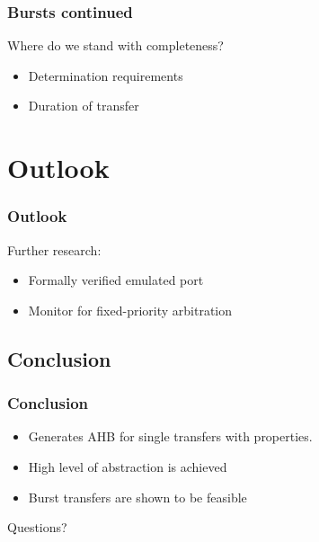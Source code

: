 \documentclass[]{beamer}
\begin{document}
\begin{frame}
 \frametitle{Bursts continued}
 Where do we stand with completeness?
 \begin{itemize}
  \item<1-> Determination requirements
  \item<2-> Duration of transfer
 \end{itemize}
\end{frame}

\section{Outlook}

\begin{frame}
 \frametitle{Outlook}
 Further research:
 \begin{itemize}
  \item<2-> Formally verified emulated port
  \item<3-> Monitor for fixed-priority arbitration
 \end{itemize}
\end{frame}

\subsection{Conclusion}

\begin{frame}
 \frametitle{Conclusion}
 \begin{itemize}
  \item<1-> Generates AHB for single transfers with properties.
  \item<2-> High level of abstraction is achieved
  \item<3-> Burst transfers are shown to be feasible
 \end{itemize}
\end{frame}


\begin{frame}
 Questions?
\end{frame}
\end{document}
